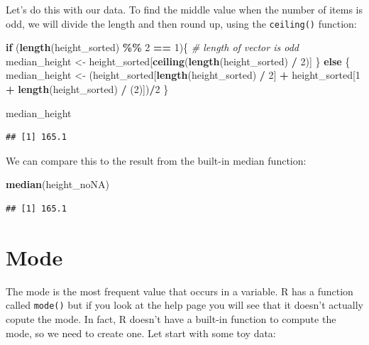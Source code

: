 \documentclass[
  12pt,
]{book}
\newenvironment{Shaded}{\begin{snugshade}}{\end{snugshade}}
\newcommand{\CommentTok}[1]{\textcolor[rgb]{0.56,0.35,0.01}{\textit{#1}}}
\newcommand{\ControlFlowTok}[1]{\textcolor[rgb]{0.13,0.29,0.53}{\textbf{#1}}}
\newcommand{\DecValTok}[1]{\textcolor[rgb]{0.00,0.00,0.81}{#1}}
\newcommand{\FunctionTok}[1]{\textcolor[rgb]{0.13,0.29,0.53}{\textbf{#1}}}
\newcommand{\NormalTok}[1]{#1}
\newcommand{\OtherTok}[1]{\textcolor[rgb]{0.56,0.35,0.01}{#1}}
\newcommand{\SpecialCharTok}[1]{\textcolor[rgb]{0.81,0.36,0.00}{\textbf{#1}}}
\begin{document}
Let's do this with our data. To find the middle value when the number of items is odd, we will divide the length and then round up, using the \texttt{ceiling()} function:

\begin{Shaded}
\begin{Highlighting}[]
\ControlFlowTok{if}\NormalTok{ (}\FunctionTok{length}\NormalTok{(height\_sorted) }\SpecialCharTok{\%\%} \DecValTok{2} \SpecialCharTok{==} \DecValTok{1}\NormalTok{)\{}
  \CommentTok{\# length of vector is odd}
\NormalTok{  median\_height }\OtherTok{\textless{}{-}} 
\NormalTok{    height\_sorted[}\FunctionTok{ceiling}\NormalTok{(}\FunctionTok{length}\NormalTok{(height\_sorted) }\SpecialCharTok{/} \DecValTok{2}\NormalTok{)]}
\NormalTok{\} }\ControlFlowTok{else}\NormalTok{ \{}
\NormalTok{  median\_height }\OtherTok{\textless{}{-}} 
\NormalTok{    (height\_sorted[}\FunctionTok{length}\NormalTok{(height\_sorted) }\SpecialCharTok{/} \DecValTok{2}\NormalTok{] }\SpecialCharTok{+} 
\NormalTok{        height\_sorted[}\DecValTok{1} \SpecialCharTok{+} \FunctionTok{length}\NormalTok{(height\_sorted) }\SpecialCharTok{/}\NormalTok{ (}\DecValTok{2}\NormalTok{)])}\SpecialCharTok{/}\DecValTok{2}
\NormalTok{\}}

\NormalTok{median\_height}
\end{Highlighting}
\end{Shaded}

\begin{verbatim}
## [1] 165.1
\end{verbatim}

We can compare this to the result from the built-in median function:

\begin{Shaded}
\begin{Highlighting}[]
\FunctionTok{median}\NormalTok{(height\_noNA)}
\end{Highlighting}
\end{Shaded}

\begin{verbatim}
## [1] 165.1
\end{verbatim}

\hypertarget{mode}{%
\section{Mode}\label{mode}}

The mode is the most frequent value that occurs in a variable. R has a function called \texttt{mode()} but if you look at the help page you will see that it doesn't actually copute the mode. In fact, R doesn't have a built-in function to compute the mode, so we need to create one. Let start with some toy data:
\end{document}
